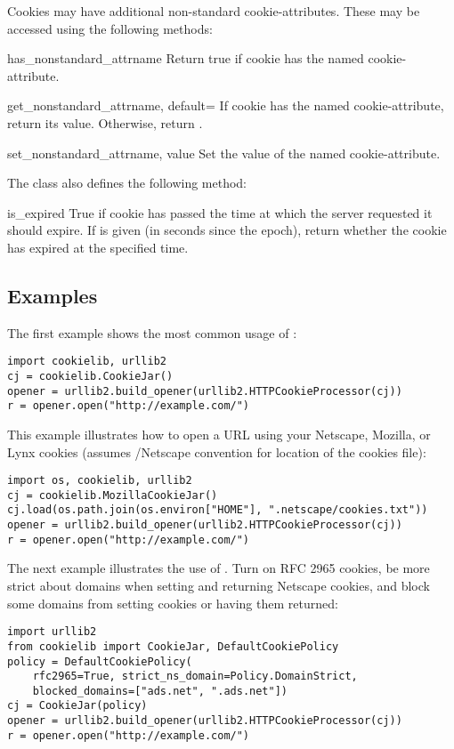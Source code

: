 Cookies may have additional non-standard cookie-attributes.  These may
be accessed using the following methods:

\begin{methoddesc}[Cookie]{has_nonstandard_attr}{name}
Return true if cookie has the named cookie-attribute.
\end{methoddesc}
\begin{methoddesc}[Cookie]{get_nonstandard_attr}{name, default=}
If cookie has the named cookie-attribute, return its value.
Otherwise, return .
\end{methoddesc}
\begin{methoddesc}[Cookie]{set_nonstandard_attr}{name, value}
Set the value of the named cookie-attribute.
\end{methoddesc}

The  class also defines the following method:

\begin{methoddesc}[Cookie]{is_expired}{}
True if cookie has passed the time at which the server requested it
should expire.  If  is given (in seconds since the epoch),
return whether the cookie has expired at the specified time.
\end{methoddesc}


\subsection{Examples \label{cookielib-examples}}

The first example shows the most common usage of :

\begin{verbatim}
import cookielib, urllib2
cj = cookielib.CookieJar()
opener = urllib2.build_opener(urllib2.HTTPCookieProcessor(cj))
r = opener.open("http://example.com/")
\end{verbatim}

This example illustrates how to open a URL using your Netscape,
Mozilla, or Lynx cookies (assumes \UNIX{}/Netscape convention for
location of the cookies file):

\begin{verbatim}
import os, cookielib, urllib2
cj = cookielib.MozillaCookieJar()
cj.load(os.path.join(os.environ["HOME"], ".netscape/cookies.txt"))
opener = urllib2.build_opener(urllib2.HTTPCookieProcessor(cj))
r = opener.open("http://example.com/")
\end{verbatim}

The next example illustrates the use of .
Turn on RFC 2965 cookies, be more strict about domains when setting
and returning Netscape cookies, and block some domains from setting
cookies or having them returned:

\begin{verbatim}
import urllib2
from cookielib import CookieJar, DefaultCookiePolicy
policy = DefaultCookiePolicy(
    rfc2965=True, strict_ns_domain=Policy.DomainStrict,
    blocked_domains=["ads.net", ".ads.net"])
cj = CookieJar(policy)
opener = urllib2.build_opener(urllib2.HTTPCookieProcessor(cj))
r = opener.open("http://example.com/")
\end{verbatim}
